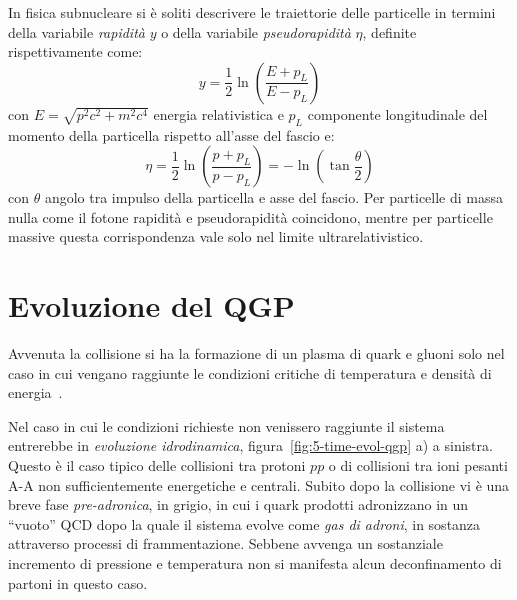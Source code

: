          In fisica subnucleare si è soliti descrivere le traiettorie delle particelle in termini della variabile \textit{rapidità} $y$ o della variabile \textit{pseudorapidità} $\eta$, definite rispettivamente come:
         \begin{equation*}
             y = \frac{1}{2} \ln(\frac{E + p_L}{E - p_L})
         \end{equation*}
        con $E = \sqrt{p^2 c^2 + m^2 c^4}$ energia relativistica e $p_L$ componente longitudinale del momento della particella rispetto all'asse del fascio e:
        \begin{equation*}
            \eta = \frac{1}{2} \ln(\frac{p + p_L}{p - p_L}) = - \ln(\tan{\frac{\theta}{2}})
        \end{equation*}
        con $\theta$ angolo tra impulso della particella e asse del fascio. Per particelle di massa nulla come il fotone rapidità e pseudorapidità coincidono, mentre per particelle massive questa corrispondenza vale solo nel limite ultrarelativistico.

\newpage

\section{Evoluzione del QGP}
    Avvenuta la collisione si ha la formazione di un plasma di quark e gluoni solo nel caso in cui vengano raggiunte le condizioni critiche di temperatura e densità di energia~\cite{Andronic_2014}.
    
    Nel caso in cui le condizioni richieste non venissero raggiunte il sistema entrerebbe in \textit{evoluzione idrodinamica}, figura~\ref{fig:5-time-evol-qgp} a) a sinistra. Questo è il caso tipico delle collisioni tra protoni $pp$ o di collisioni tra ioni pesanti A-A non sufficientemente energetiche e centrali. Subito dopo la collisione vi è una breve fase \textit{pre-adronica}, in grigio, in cui i quark prodotti adronizzano in un ``vuoto'' QCD dopo la quale il sistema evolve come \textit{gas di adroni}, in sostanza attraverso processi di frammentazione. Sebbene avvenga un sostanziale incremento di pressione e temperatura non si manifesta alcun deconfinamento di partoni in questo caso.

